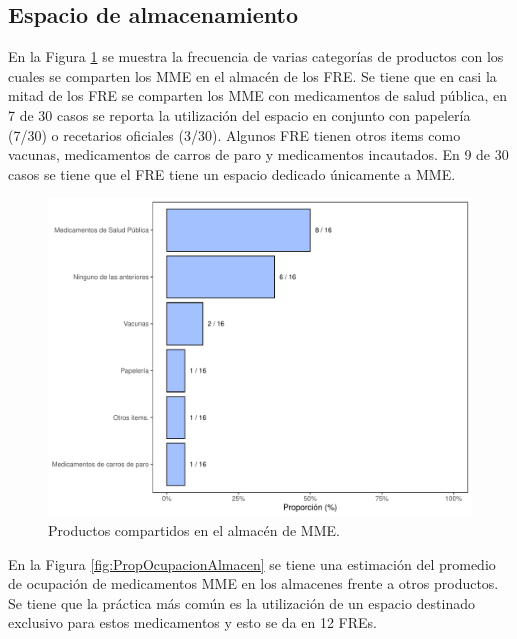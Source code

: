 \documentclass[
]{book}
\begin{document}
\hypertarget{espacio-de-almacenamiento}{%
\subsection{Espacio de almacenamiento}\label{espacio-de-almacenamiento}}

En la Figura \ref{fig:ProductosCompartidos1} se muestra la frecuencia de varias categorías de productos con los cuales se comparten los MME en el almacén de los FRE. Se tiene que en casi la mitad de los FRE se comparten los MME con medicamentos de salud pública, en 7 de 30 casos se reporta la utilización del espacio en conjunto con papelería (7/30) o recetarios oficiales (3/30). Algunos FRE tienen otros items como vacunas, medicamentos de carros de paro y medicamentos incautados. En 9 de 30 casos se tiene que el FRE tiene un espacio dedicado únicamente a MME.

\begin{figure}

{\centering \includegraphics[width=0.85\linewidth]{InformeFinal_files/figure-latex/ProductosCompartidos1-1} 

}

\caption{Productos compartidos en el almacén de MME.}\label{fig:ProductosCompartidos1}
\end{figure}

En la Figura \ref{fig:PropOcupacionAlmacen} se tiene una estimación del promedio de ocupación de medicamentos MME en los almacenes frente a otros productos. Se tiene que la práctica más común es la utilización de un espacio destinado exclusivo para estos medicamentos y esto se da en 12 FREs.
\end{document}
